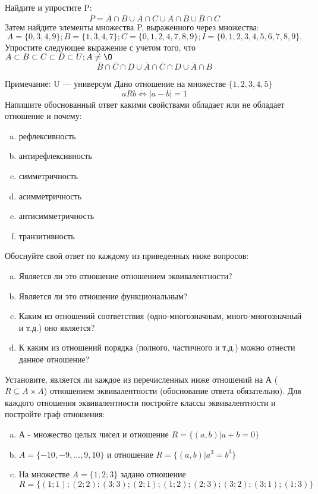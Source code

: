 \documentclass[10pt]{exam}
\begin{document}
\begin{questions}
\question
Найдите и упростите P:
\begin{equation*}
\overline{P} = \overline{A} \cap B \cup \overline{A} \cap C \cup A \cap \overline{B} \cup \overline{B} \cap C
\end{equation*}
Затем найдите элементы множества P, выраженного через множества:
\begin{equation*}
A = \{0, 3, 4, 9\}; 
B = \{1, 3, 4, 7\};
C = \{0, 1, 2, 4, 7, 8, 9\};
I = \{0, 1, 2, 3, 4, 5, 6, 7, 8, 9\}.
\end{equation*}\question
Упростите следующее выражение с учетом того, что $A\subset B \subset C \subset D \subset U; A \neq \O$
\begin{equation*}
\overline{B} \cap \overline{C} \cap D \cup \overline{A} \cap \overline{C} \cap D \cup \overline{A} \cap B
\end{equation*}

Примечание: U — универсум\question
Дано отношение на множестве $\{1, 2, 3, 4, 5\}$ 
\begin{equation*}
aRb \iff |a-b| = 1
\end{equation*}
Напишите обоснованный ответ какими свойствами обладает или не обладает отношение и почему:   
\begin{enumerate} [a)]\setcounter{enumi}{0}
\item рефлексивность
\item антирефлексивность
\item симметричность
\item асимметричность
\item антисимметричность
\item транзитивность
\end{enumerate}

Обоснуйте свой ответ по каждому из приведенных ниже вопросов:
\begin{enumerate} [a)]\setcounter{enumi}{0}
    \item Является ли это отношение отношением эквивалентности?
    \item Является ли это отношение функциональным?
    \item Каким из отношений соответствия (одно-многозначным, много-многозначный и т.д.) оно является?
    \item К каким из отношений порядка (полного, частичного и т.д.) можно отнести данное отношение?
\end{enumerate}

\question
Установите, является ли каждое из перечисленных ниже отношений на А ($R \subseteq A \times A$) отношением эквивалентности (обоснование ответа обязательно). Для каждого отношения эквивалентности 
постройте классы эквивалентности и постройте граф отношения:
\begin{enumerate}[a)]\setcounter{enumi}{0}
\item А - множество целых чисел и отношение $R = \{(a,b)|a + b = 0\}$
\item $A = \{-10, -9, …, 9, 10\}$ и отношение $R = \{(a,b)|a^{3} = b^{3}\}$
\item На множестве $A = \{1; 2; 3\}$ задано отношение $R = \{(1; 1); (2; 2); (3; 3); (2; 1); (1; 2); (2; 3); (3; 2); (3; 1); (1; 3)\}$


\end{enumerate}
\end{questions}
\end{document}
